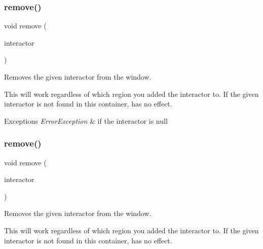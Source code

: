 \subsubsection{\texorpdfstring{remove()}{remove()}\hspace{0.1cm}{\footnotesize\ttfamily [1/4]}}
{\footnotesize\ttfamily void remove (\begin{DoxyParamCaption}\item[{\mbox{\hyperlink{classsgl_1_1GInteractor}{G\+Interactor}} $\ast$}]{interactor }\end{DoxyParamCaption})\hspace{0.3cm}{\ttfamily [virtual]}}



Removes the given interactor from the window. 

This will work regardless of which region you added the interactor to. If the given interactor is not found in this container, has no effect. 
\begin{DoxyExceptions}{Exceptions}
{\em Error\+Exception} & if the interactor is null \\
\hline
\end{DoxyExceptions}
\mbox{\label{classsgl_1_1GWindow_ade2376c458ac401a0bd2dbe44271509e}} 
\subsubsection{\texorpdfstring{remove()}{remove()}\hspace{0.1cm}{\footnotesize\ttfamily [2/4]}}
{\footnotesize\ttfamily void remove (\begin{DoxyParamCaption}\item[{\mbox{\hyperlink{classsgl_1_1GInteractor}{G\+Interactor}} \&}]{interactor }\end{DoxyParamCaption})\hspace{0.3cm}{\ttfamily [virtual]}}



Removes the given interactor from the window. 

This will work regardless of which region you added the interactor to. If the given interactor is not found in this container, has no effect. \mbox{\label{classsgl_1_1GWindow_afc8bff4a24e05c696cbe4cba7403e558}} 
